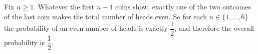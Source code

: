 Fix $n\ge1$. Whatever the first $n-1$ coins show, exactly one of the two outcomes of the last coin makes the total number of heads even. So for each $n\in\{1,\dots,6\}$ the probability of an even number of heads is exactly $\dfrac{1}{2}$, and therefore the overall probability is $\boxed{\dfrac{1}{2}}$.
